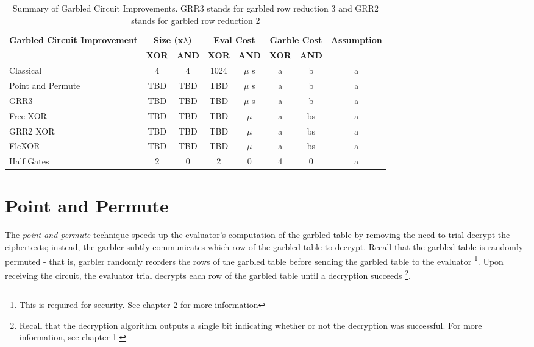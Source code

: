 \begin{table}[t]
    \label{tbl:gc-costs}
    \centering
    \renewcommand{\arraystretch}{1.2}
    \begin{adjustbox}{width=1\textwidth}
        \begin{tabular}{|p{5cm}|c|c|c|c|c|c|c|}
            \hline
            \multirow{2}{5cm}{\centering \textbf{Garbled Circuit Improvement}} & 
            \multicolumn{2}{c|}{\textbf{Size (x$\lambda$)}} & 
            \multicolumn{2}{c|}{\textbf{Eval Cost}} & 
            \multicolumn{2}{c|}{\textbf{Garble Cost}} &
            \multirow{2}{3cm}{\centering \textbf{Assumption}} \\
            \cline{2-7}
            & \textbf{XOR} & \textbf{AND} & \textbf{XOR} & \textbf{AND}  & \textbf{XOR} & \textbf{AND} & \\
            \hline
            Classical & 4 & 4 & 1024 & $\mu$ s & a & b & a\\ \hline
            Point and Permute & TBD & TBD & TBD & $\mu$ s & a & b & a\\ \hline
            GRR3 & TBD & TBD & TBD & $\mu$ s  & a & b& a\\ \hline
            Free XOR & TBD & TBD & TBD & $\mu$ & a & bs& a  \\ \hline
            GRR2 XOR & TBD & TBD & TBD & $\mu$ & a & bs  & a\\ \hline
            FleXOR& TBD & TBD & TBD & $\mu$ & a & bs & a \\ \hline
            Half Gates & 2 & 0 & 2 & 0 & 4 & 0 & a \\ \hline
        \end{tabular}
    \end{adjustbox}
    \caption{Summary of Garbled Circuit Improvements. GRR3 stands for garbled row reduction 3 and GRR2 stands for garbled row reduction 2}
\end{table}

\section{Point and Permute}

The \textit{point and permute} technique speeds up the evaluator's computation of the garbled table by removing the need to trial decrypt the ciphertexts; instead, the garbler subtly communicates which row of the garbled table to decrypt.
Recall that the garbled table is randomly permuted - that is, garbler randomly reorders the rows of the garbled table before sending the garbled table to the evaluator \footnote{This is required for security. See chapter 2 for more information}.
Upon receiving the circuit, the evaluator trial decrypts each row of the garbled table until a decryption succeeds \footnote{Recall that the decryption algorithm outputs a single bit indicating whether or not the decryption was successful. For more information, see chapter 1.}.

